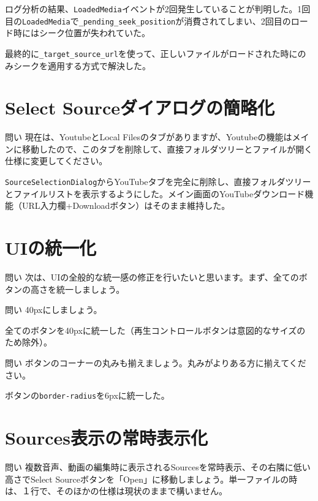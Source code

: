 \documentclass[10pt,a4paper,twocolumn]{article}
\begin{document}
ログ分析の結果、\texttt{LoadedMedia}イベントが2回発生していることが判明した。1回目の\texttt{LoadedMedia}で\texttt{\_pending\_seek\_position}が消費されてしまい、2回目のロード時にはシーク位置が失われていた。

最終的に\texttt{\_target\_source\_url}を使って、正しいファイルがロードされた時にのみシークを適用する方式で解決した。

\section{Select Sourceダイアログの簡略化}

\begin{itembox}[l]{問い}
現在は、YoutubeとLocal Filesのタブがありますが、Youtubeの機能はメインに移動したので、このタブを削除して、直接フォルダツリーとファイルが開く仕様に変更してください。
\end{itembox}

\texttt{SourceSelectionDialog}からYouTubeタブを完全に削除し、直接フォルダツリーとファイルリストを表示するようにした。メイン画面のYouTubeダウンロード機能（URL入力欄+Downloadボタン）はそのまま維持した。

\section{UIの統一化}

\begin{itembox}[l]{問い}
次は、UIの全般的な統一感の修正を行いたいと思います。まず、全てのボタンの高さを統一しましょう。
\end{itembox}

\begin{itembox}[l]{問い}
40pxにしましょう。
\end{itembox}

全てのボタンを40pxに統一した（再生コントロールボタンは意図的なサイズのため除外）。

\begin{itembox}[l]{問い}
ボタンのコーナーの丸みも揃えましょう。丸みがよりある方に揃えてください。
\end{itembox}

ボタンの\texttt{border-radius}を6pxに統一した。

\section{Sources表示の常時表示化}

\begin{itembox}[l]{問い}
複数音声、動画の編集時に表示されるSourcesを常時表示、その右隣に低い高さでSelect Sourceボタンを「Open」に移動しましょう。単一ファイルの時は、１行で、そのほかの仕様は現状のままで構いません。
\end{itembox}
\end{document}
